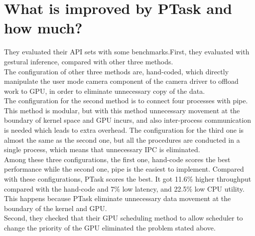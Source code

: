 \documentclass[10pt,a4paper]{ltjsarticle}       %
\begin{document}
\section{What is improved by PTask and how much?}
They evaluated their API sets with some benchmarks.First, they evaluated with gestural inference, compared with other three methods.\\
The configuration of other three methods are, hand-coded, which directly manipulate the user mode camera component of the camera driver to offload work to GPU, in order to eliminate unnecessary copy of the data.\\
The configuration for the second method is to connect four processes with pipe. This method is modular, but with this method unnecessary movement at the boundary of kernel space and GPU incurs, and also inter-process communication is needed which leads to extra overhead.
The configuration for the third one is almost the same as the second one, but all the procedures are conducted in a single process, which means that unnecessary IPC is eliminated.\\
Among these three configurations, the first one, hand-code scores the best performance while the second one, pipe is the easiest to implement. Compared with these configurations, PTask scores the best. It got 11.6\% higher throughput compared with the hand-code and 7\% low latency, and 22.5\% low CPU utility. This happens because PTask eliminate unnecessary data movement at the boundary of the kernel and GPU.\\
Second, they checked that their GPU scheduling method to allow scheduler to change the priority of the GPU eliminated the problem stated above.
\end{document}
